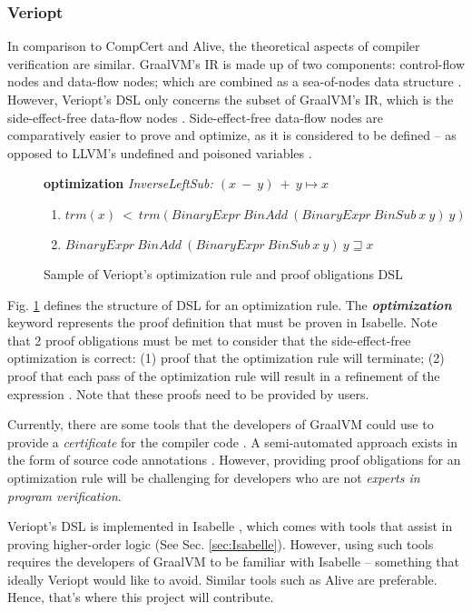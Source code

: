 \subsubsection{Veriopt}
\label{sec:Veriopt}

In comparison to CompCert and Alive, the theoretical aspects of compiler verification are similar. GraalVM's IR is made up of two components: 
control-flow nodes and data-flow nodes; which are combined as a sea-of-nodes data structure \cite{ATVA21_GraalVM_IR_Semantics}. However, 
Veriopt's DSL only concerns the subset of GraalVM's IR, which is the side-effect-free data-flow nodes \cite{Term_Graph_Optimizations}.
Side-effect-free data-flow nodes are comparatively easier to prove and optimize, as it is considered to be defined -- as opposed to LLVM's undefined 
and poisoned variables \cite{Alive2}.

\begin{figure}[h]
    \textbf{optimization} \emph{InverseLeftSub: \((x\ -\ y)\ +\ y \longmapsto x\)}
    \begin{enumerate}
        \item \(trm(x)\ <\ trm(BinaryExpr\ BinAdd\ (BinaryExpr\ BinSub\ x\ y)\ y)\)
        \item \(BinaryExpr\ BinAdd\ (BinaryExpr\ BinSub\ x\ y)\ y \sqsupseteq x\)
    \end{enumerate}

    \caption{Sample of Veriopt's optimization rule and proof obligations DSL \cite[Fig. 3]{Term_Graph_Optimizations}}
    \label{fig:VerioptDSLSample}
\end{figure}

Fig. \ref{fig:VerioptDSLSample} defines the structure of DSL for an optimization rule. The \emph{\textbf{optimization}} keyword represents 
the proof definition that must be proven in Isabelle. Note that 2 proof obligations must be met to consider that the 
side-effect-free optimization is correct: (1) proof that the optimization rule will terminate; (2) proof that each pass of the optimization rule will 
result in a refinement of the expression \cite{Term_Graph_Optimizations}. Note that these proofs need to be provided by users.

Currently, there are some tools that the developers of GraalVM could use to provide a \emph{certificate} for the compiler code 
\cite[Sec. 7]{Term_Graph_Optimizations}. A semi-automated approach exists in the form of source code annotations \cite[Sec. 5.1]{Term_Graph_Optimizations}.
However, providing proof obligations for an optimization rule will be challenging for developers who are not \emph{experts in program verification}. 

Veriopt's DSL is implemented in Isabelle \cite{IsabelleHOL}, which comes with tools that assist in proving higher-order logic (See Sec. \ref{sec:Isabelle}). 
However, using such tools requires the developers of GraalVM to be familiar with Isabelle -- something that ideally Veriopt would like to avoid. 
Similar tools such as Alive \cite{AliveInLean} are preferable. Hence, that's where this project will contribute.